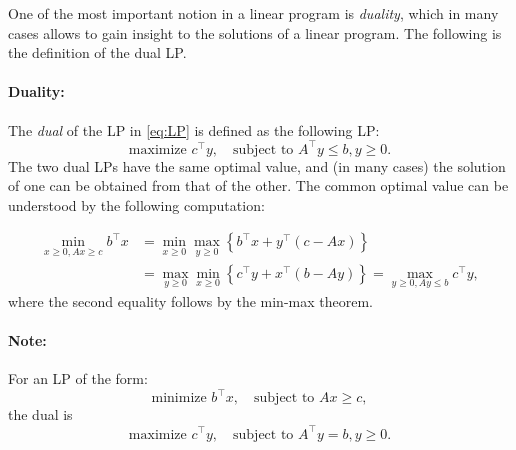 One of the most important notion in a linear program is \textit{duality}, which in many cases allows to gain insight to the solutions of a linear program. The following is the definition of the dual LP.

\paragraph{Duality:} The \emph{dual} of the LP in \eqref{eq:LP} is defined as the following LP:
\begin{equation}\label{eq:LP_dual}
\textrm{maximize } {c^\top}y,   \quad \textrm{subject to } {A^\top}y
\le b,  y \ge 0.
\end{equation}
The two dual LPs have the same optimal value, and (in many cases)
the solution of one can be obtained from that of the other. The
common optimal value can be understood by the following computation:

\begin{align*}
\mathop {\min }\limits_{x \ge 0,Ax \ge c} {b^\top}x &= \mathop {\min }\limits_{x \ge 0} \mathop {\max }\limits_{y \ge 0} \left\{ {{b^\top}x + {y^\top}(c - Ax)} \right\}\\
 &= \mathop {\max }\limits_{y \ge 0} \mathop {\min }\limits_{x \ge 0} \left\{ {{c^\top}y + {x^\top}(b - Ay)} \right\} = \mathop {\max }\limits_{y \ge 0,Ay \le b} {c^\top}y,
\end{align*}
where the second equality follows by the min-max theorem.

\paragraph{Note:} For an LP of the form:
\begin{equation*}
 \textrm{minimize } {b^\top}x,   \quad \textrm{subject to } Ax \ge c,
\end{equation*}
the dual is
\begin{equation*}
\textrm{maximize } {c^\top}y,   \quad \textrm{subject to } {A^\top}y
= b,  y \ge 0.
\end{equation*}


